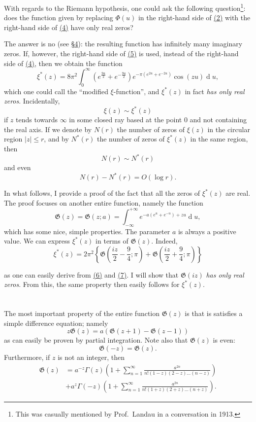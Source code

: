 \documentclass{article}
\theoremstyle{plain}
\newcommand{\dd}{\operatorname{d}\!}
\newcommand{\GG}{\mathfrak{G}}
\renewcommand{\leq}{\leqslant}
\newcommand{\oldpage}[1]{\marginpar{\footnotesize$\Big\vert$ \textit{p.~#1}}}
\begin{document}
\oldpage{306}
With regards to the Riemann hypothesis, one could ask the following question\footnote{This was casually mentioned by Prof.~Landau in a conversation in 1913.}: does the function given by replacing $\Phi(u)$ in the right-hand side of \hyperref[2]{(2)} with the right-hand side of \hyperref[4]{(4)} have only real zeros?

The answer is no (see \hyperref[section4]{\S4}): the resulting function has infinitely many imaginary zeros.
If, however, the right-hand side of \hyperref[5]{(5)} is used, instead of the right-hand side of \hyperref[4]{(4)}, then we obtain the function
\[
\label{6}
  \xi^*(z) = 8\pi^2 \int_0^\infty \left(
    e^{\frac{9u}{2}} + e^{-\frac{9u}{2}}
  \right) e^{-\pi(e^{2u}+e^{-2u})} \cos(zu) \dd u,
\tag{6}
\]
which one could call the ``modified $\xi$-function'', and $\xi^*(z)$ in fact \emph{has only real zeros}.
Incidentally,
\[
  \xi(z) \sim \xi^*(z)
\]
if $z$ tends towards $\infty$ in some closed ray based at the point $0$ and not containing the real axis.
If we denote by $N(r)$ the number of zeros of $\xi(z)$ in the circular region $|z|\leq r$, and by $N^*(r)$ the number of zeros of $\xi^*(z)$ in the same region, then
\[
  N(r) \sim N^*(r)
\]
and even
\[
  N(r) - N^*(r) = O(\log r).
\]

In what follows, I provide a proof of the fact that all the zeros of $\xi^*(z)$ are real.
The proof focuses on another entire function, namely the function
\[
\label{7}
  \GG(z) = \GG(z;a) = \int_{-\infty}^{+\infty} e^{-a(e^u+e^{-u})+zu} \dd u,
\tag{7}
\]
which has some nice, simple properties.
The parameter $a$ is always a positive value.
We can express $\xi^*(z)$ in terms of $\GG(z)$.
Indeed,
\[
\label{8}
  \xi^*(z) = 2\pi^2 \left\{
    \GG\left(
      \frac{iz}{2} - \frac94; \pi
    \right) +
    \GG\left(
      \frac{iz}{2} + \frac94; \pi
    \right)
  \right\}
\tag{8}
\]

\oldpage{307}
as one can easily derive from \hyperref[6]{(6)} and \hyperref[7]{(7)}.
I will show that $\GG(iz)$ \emph{has only real zeros}.
From this, the same property then easily follows for $\xi^*(z)$.


\section{}
\label{section1}

The most important property of the entire function $\GG(z)$ is that is satisfies a simple difference equation;
namely
\[
\label{9}
  z\GG(z) = a(\GG(z+1) - \GG(z-1))
\tag{9}
\]
as can easily be proven by partial integration.
Note also that $\GG(z)$ is even:
\[
\label{10}
  \GG(-z) = \GG(z).
\tag{10}
\]
Furthermore, if $z$ is not an integer, then
\[
\label{11}
  \begin{aligned}
    \GG(z)
    &= a^{-z}\Gamma(z) \left(
      1 + \sum_{n=1}^\infty \frac{a^{2n}}{n!(1-z)(2-z)\ldots(n-z)}
    \right)
  \\&+ a^z\Gamma(-z) \left(
      1 + \sum_{n=1}^\infty \frac{a^{2n}}{n!(1+z)(2+z)\ldots(n+z)}
    \right).
  \end{aligned}
\tag{11}
\]
\end{document}
